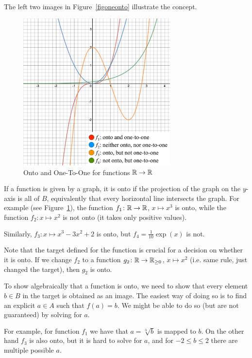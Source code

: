The left two images in Figure~\ref{figoneonto} illustrate the concept.

\begin{figure}[t]
\begin{center}
\includegraphics[width=8cm]{pic/OneToOneOnto.pdf}
\caption{Onto and One-To-One for functions ${\mathbb R}\to{\mathbb R}$}
\label{figoneontofcts}
\end{center}
\end{figure}

If a function is given by a graph, it is onto if the projection of the graph
on the $y$-axis is all of $B$, equivalently that every horizontal line intersects the
graph.
For example (see Figure~\ref{figoneontofcts}), the function $f_1\colon{\mathbb R}\to{\mathbb R}$, $x\mapsto x^3$ is onto, while
the function $f_2\colon x\mapsto x^2$ is not onto (it takes only positive
values).

Similarly, $f_3\colon x\mapsto x^3-3x^2+2$ is
onto, but $f_4=\frac{1}{10}\exp(x)$ is not.

Note that the target defined for the function is crucial for a decision on
whether it is onto. If we change $f_2$ to a function $g_2\colon{\mathbb R}\to{\mathbb R}_{\ge
0}$, $x\mapsto x^2$ (i.e. same rule, just changed the target), then $g_2$ is
onto.
\medskip

To show algebraically that a function is onto, we need to show that every
element $b\in B$ in the target is obtained as an image. The easiest way of
doing so is to find an explicit $a\in A$ such that $f(a)=b$. We might be
able to do so (but are not guaranteed) by solving for $a$.

For example, for function $f_1$ we have that $a=\sqrt[3]{b}$ is mapped to
$b$. On the other hand $f_3$ is also onto, but it is hard to solve for $a$,
and for $-2\le b\le 2$ there are multiple possible $a$.
\smallskip

